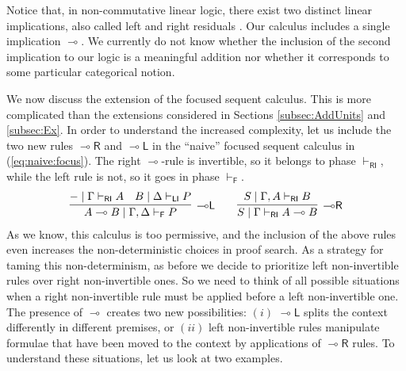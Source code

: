 \documentclass[submission,copyright,creativecommons]{eptcs}
\theoremstyle{definition}
\newcommand{\lright}{{\multimap}\mathsf{R}}
\newcommand{\lleft}{{\multimap}\mathsf{L}}
\newcommand{\lolli}{\multimap}
\newcommand{\RI}{\mathsf{RI}}
\newcommand{\LI}{\mathsf{LI}}
\newcommand{\F}{\mathsf{F}}
\begin{document}
Notice that, in non-commutative linear logic, there exist two distinct linear implications, also called left and right residuals \cite{lambek:mathematics:58}. Our calculus includes a single implication $\lolli$. We currently do not know whether the inclusion of the second implication to our logic is a meaningful addition nor whether it corresponds to some particular categorical notion. 

We now discuss the extension of the focused sequent calculus. This is more complicated than the extensions considered in Sections \ref{subsec:AddUnits} and \ref{subsec:Ex}. In order to understand the increased complexity, let us include the two new rules $\lright$ and $\lleft$ in the ``naive'' focused sequent calculus in (\ref{eq:naive:focus}). The right $\lolli$-rule is invertible, so it belongs to phase $\vdash_\RI$, while the left rule is not, so it goes in phase $\vdash_\F$.
\begin{displaymath}
  \begin{array}{c}
    \infer[\lleft]{A \lolli B \mid \Gamma , \Delta \vdash_\F P}{
      - \mid \Gamma \vdash_\RI A
      &
      B \mid \Delta \vdash_\LI P
    }
    \qquad
    \infer[\lright]{S \mid \Gamma \vdash_\RI A \lolli B}{S \mid \Gamma , A \vdash_\RI B}
  \end{array}
\end{displaymath}
As we know, this calculus is too permissive, and the inclusion of the above rules even increases the non-deterministic choices in proof search. As a strategy for taming this non-determinism, as before we  decide to prioritize left non-invertible rules over right non-invertible ones. So we need to think of all possible situations when a right non-invertible rule must be applied before a left non-invertible one. The presence of $\lolli$ creates two new possibilities: $(i)$ $\lleft$ splits the context differently in different premises, or $(ii)$ left non-invertible rules manipulate formulae that have been moved to the context by applications of $\lright$ rules. To understand these situations, let us look at two examples.
\end{document}
